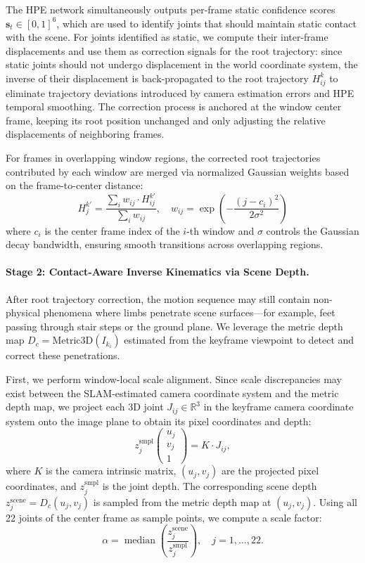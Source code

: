 The HPE network simultaneously outputs per-frame static confidence scores $\mathbf{s}_t \in [0,1]^6$, which are used to identify joints that should maintain static contact with the scene. For joints identified as static, we compute their inter-frame displacements and use them as correction signals for the root trajectory: since static joints should not undergo displacement in the world coordinate system, the inverse of their displacement is back-propagated to the root trajectory $H_{ij}^{k}$ to eliminate trajectory deviations introduced by camera estimation errors and HPE temporal smoothing. The correction process is anchored at the window center frame, keeping its root position unchanged and only adjusting the relative displacements of neighboring frames.

For frames in overlapping window regions, the corrected root trajectories contributed by each window are merged via normalized Gaussian weights based on the frame-to-center distance:
%
\begin{equation}
  H_{j}^{k'} = \frac{\sum_{i} w_{ij} \cdot H_{ij}^{k'}}{\sum_{i} w_{ij}}, \quad w_{ij} = \exp\!\left(-\frac{(j - c_i)^2}{2\sigma^2}\right)
\end{equation}
%
where $c_i$ is the center frame index of the $i$-th window and $\sigma$ controls the Gaussian decay bandwidth, ensuring smooth transitions across overlapping regions.

\paragraph{Stage 2: Contact-Aware Inverse Kinematics via Scene Depth.}
After root trajectory correction, the motion sequence may still contain non-physical phenomena where limbs penetrate scene surfaces---for example, feet passing through stair steps or the ground plane. We leverage the metric depth map $D_c = \text{Metric3D}(I_{k_i})$ estimated from the keyframe viewpoint to detect and correct these penetrations.

First, we perform window-local scale alignment. Since scale discrepancies may exist between the SLAM-estimated camera coordinate system and the metric depth map, we project each 3D joint $J_{ij} \in \mathbb{R}^3$ in the keyframe camera coordinate system onto the image plane to obtain its pixel coordinates and depth:
%
\begin{equation}
  z_j^{\text{smpl}} \begin{pmatrix} u_j \\ v_j \\ 1 \end{pmatrix} = K \cdot J_{ij},
\end{equation}
%
where $K$ is the camera intrinsic matrix, $(u_j, v_j)$ are the projected pixel coordinates, and $z_j^{\text{smpl}}$ is the joint depth. The corresponding scene depth $z_j^{\text{scene}} = D_c(u_j, v_j)$ is sampled from the metric depth map at $(u_j, v_j)$. Using all 22 joints of the center frame as sample points, we compute a scale factor:
%
\begin{equation}
  \alpha = \operatorname{median}\!\left(\frac{z_j^{\text{scene}}}{z_j^{\text{smpl}}}\right), \quad j = 1, \ldots, 22.
\end{equation}

